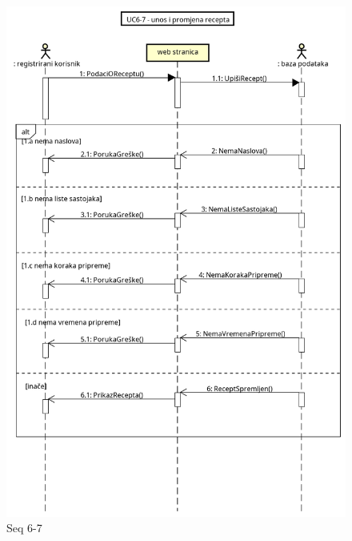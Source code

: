 				\begin{figure}[H]
					\centering
					\includegraphics[width=1.2\linewidth]{"slike/dijagrami/Seq 6-7"}
					\caption{Seq 6-7}
					\label{fig:seq-6-7}
				\end{figure}
				
